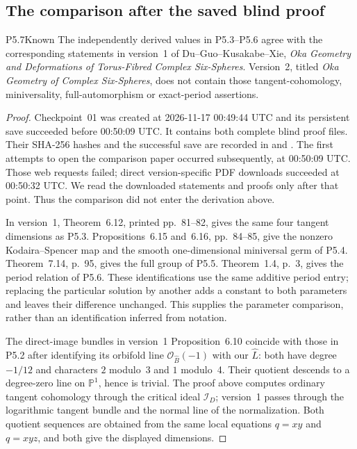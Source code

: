 \subsection{The comparison after the saved blind proof}

\begin{statement}{P5.7}{Known}
The independently derived values in P5.3--P5.6 agree with the corresponding
statements in version~1 of Du--Guo--Kusakabe--Xie,
\emph{Oka Geometry and Deformations of Torus-Fibred Complex Six-Spheres}.
Version~2, titled \emph{Oka Geometry of Complex Six-Spheres}, does not
contain those tangent-cohomology, miniversality, full-automorphism or
exact-period assertions.
\end{statement}
\begin{proof}
Checkpoint~01 was created at 2026-11-17 00:49:44 UTC and its persistent
save succeeded before 00:50:09 UTC. It contains both complete blind
proof files. Their SHA-256 hashes and the successful save are recorded
in  and
. The first attempts to open the
comparison paper occurred subsequently, at 00:50:09 UTC. Those web
requests failed; direct version-specific PDF downloads succeeded at
00:50:32 UTC. We read the downloaded statements and proofs only after
that point. Thus the comparison did not enter the derivation above.

In version~1, Theorem~6.12, printed pp.~81--82, gives the same four
tangent dimensions as P5.3. Propositions~6.15 and~6.16, pp.~84--85,
give the nonzero Kodaira--Spencer map and the smooth one-dimensional
miniversal germ of P5.4. Theorem~7.14, p.~95, gives the full group of
P5.5. Theorem~1.4, p.~3, gives the period relation of P5.6. These
identifications use the same additive period entry; replacing the
particular solution by another adds a constant to both parameters
and leaves their difference unchanged. This supplies the parameter
comparison, rather than an identification inferred from notation.

The direct-image bundles in version~1 Proposition~6.10 coincide with
those in P5.2 after identifying its orbifold line
$\mathcal O_{\widehat B}(-1)$ with our $\widehat L$: both have degree
$-1/12$ and characters $2$ modulo~3 and $1$ modulo~4. Their quotient
descends to a degree-zero line on $\mathbb P^1$, hence is trivial.
The proof above computes ordinary tangent cohomology through the
critical ideal $\mathcal I_D$; version~1 passes through the
logarithmic tangent bundle and the normal line of the normalization.
Both quotient sequences are obtained from the same local equations
$q=xy$ and $q=xyz$, and both give the displayed dimensions.


\end{proof}
